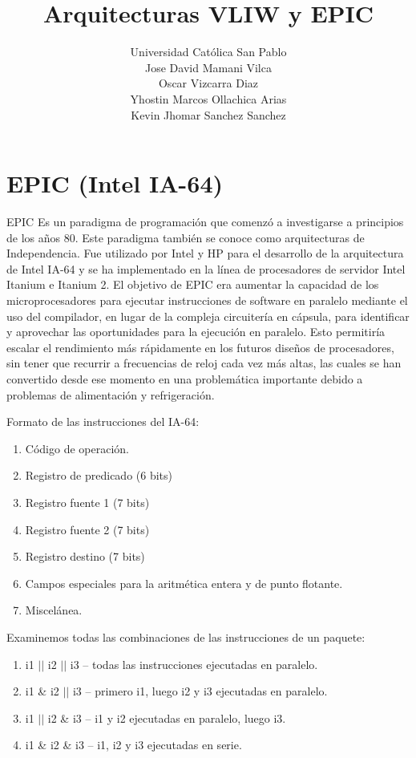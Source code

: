 \documentclass[11pt, conference]{IEEEtran}
\begin{document}
	\title{\bf Arquitecturas VLIW y EPIC}
	\author{Universidad Católica San Pablo \\ Jose David Mamani Vilca
	\\ Oscar Vizcarra Diaz
	\\ Yhostin Marcos Ollachica Arias
	\\ Kevin Jhomar Sanchez Sanchez}
	\maketitle

\section{EPIC (Intel IA-64)}
EPIC Es un paradigma de programación que comenzó a investigarse a principios de los años 80. Este paradigma también se conoce como arquitecturas de Independencia. Fue utilizado por Intel y HP para el desarrollo de la arquitectura de Intel IA-64 y se ha implementado en la línea de procesadores de servidor Intel Itanium e Itanium 2. El objetivo de EPIC era aumentar la capacidad de los microprocesadores para ejecutar instrucciones de software en paralelo mediante el uso del compilador, en lugar de la compleja circuitería en cápsula, para identificar y aprovechar las oportunidades para la ejecución en paralelo. Esto permitiría escalar el rendimiento más rápidamente en los futuros diseños de procesadores, sin tener que recurrir a frecuencias de reloj cada vez más altas, las cuales se han convertido desde ese momento en una problemática importante debido a problemas de alimentación y refrigeración.

Formato de las instrucciones del IA-64:
\begin{enumerate}
	\item Código de operación.
	\item Registro de predicado (6 bits)
	\item Registro fuente 1 (7 bits)
	\item Registro fuente 2 (7 bits)
	\item Registro destino (7 bits)
	\item Campos especiales para la aritmética entera y de punto flotante.
	\item Miscelánea.
\end{enumerate}

Examinemos todas las combinaciones de las instrucciones de un paquete:
\begin{enumerate}
\item i1 $||$ i2 $||$ i3 – todas las instrucciones ejecutadas en paralelo.
\item i1 \& i2 $||$ i3 – primero i1, luego i2 y i3 ejecutadas en paralelo.
\item i1 $||$ i2 \& i3 – i1 y i2 ejecutadas en paralelo, luego i3.
\item i1 \& i2 \& i3 – i1, i2 y i3 ejecutadas en serie.
\end{enumerate}
\end{document}
